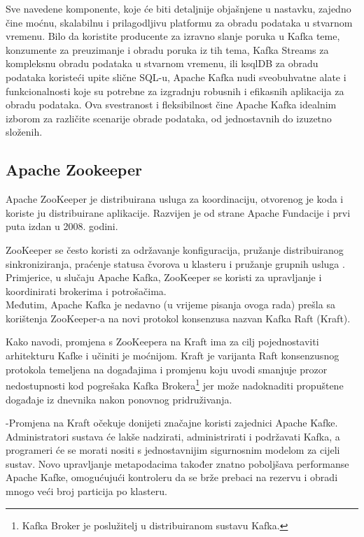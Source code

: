 \documentclass[times, utf8, diplomski]{fer}
\begin{document}
Sve navedene komponente, koje će biti detaljnije objašnjene u nastavku, zajedno čine moćnu, skalabilnu i prilagodljivu platformu za obradu podataka u stvarnom vremenu. Bilo da koristite producente za izravno slanje poruka u Kafka teme, konzumente za preuzimanje i obradu poruka iz tih tema, Kafka Streams za kompleksnu obradu podataka u stvarnom vremenu, ili ksqlDB za obradu podataka koristeći upite slične SQL-u, Apache Kafka nudi sveobuhvatne alate i funkcionalnosti koje su potrebne za izgradnju robusnih i efikasnih aplikacija za obradu podataka. Ova svestranost i fleksibilnost čine Apache Kafka idealnim izborom za različite scenarije obrade podataka, od jednostavnih do izuzetno složenih.

\subsection{Apache Zookeeper}

Apache ZooKeeper je distribuirana usluga za koordinaciju, otvorenog je koda i koriste ju distribuirane aplikacije. Razvijen je od strane Apache Fundacije i prvi puta izdan u 2008. godini.

ZooKeeper se često koristi za održavanje konfiguracija, pružanje distribuiranog sinkroniziranja, praćenje statusa čvorova u klasteru i pružanje grupnih usluga \citep{hunt_zookeeper_nodate}. Primjerice, u slučaju Apache Kafka, ZooKeeper se koristi za upravljanje i koordinirati brokerima i potrošačima.\\

Međutim, Apache Kafka je nedavno (u vrijeme pisanja ovoga rada) prešla sa korištenja ZooKeeper-a na novi protokol konsenzusa nazvan Kafka Raft (Kraft).

Kako \citet{chandrakant_kafkas_2022} navodi, promjena s ZooKeepera na Kraft ima za cilj pojednostaviti arhitekturu Kafke i učiniti je moćnijom. Kraft je varijanta Raft konsenzusnog protokola temeljena na događajima i promjenu koju uvodi smanjuje prozor nedostupnosti kod pogrešaka Kafka Brokera\footnote{Kafka Broker je poslužitelj u distribuiranom sustavu Kafka.} jer može nadoknaditi propuštene događaje iz dnevnika nakon ponovnog pridruživanja. 

-Promjena na Kraft očekuje donijeti značajne koristi zajednici Apache Kafke. Administratori sustava će lakše nadzirati, administrirati i podržavati Kafka, a programeri će se morati nositi s jednostavnijim sigurnosnim modelom za cijeli sustav. Novo upravljanje metapodacima također znatno poboljšava performanse Apache Kafke, omogućujući kontroleru da se brže prebaci na rezervu i obradi mnogo veći broj particija po klasteru.
\end{document}
